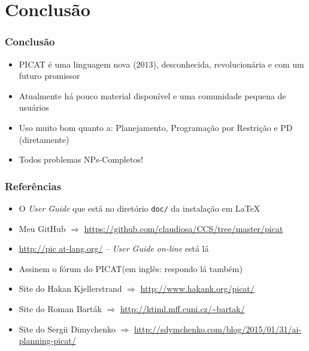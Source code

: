 \documentclass[10pt]{beamer}
\begin{document}


\section{Conclusão}
\begin{frame}
    \frametitle{Conclusão}
    \begin{itemize}
    \item PICAT é uma linguagem nova (2013), 
    desconhecida, revolucionária e com um futuro promissor
    
    \item Atualmente há pouco material disponível e uma comunidade pequena de usuários

    \item Uso muito bom quanto a: Planejamento, Programação por Restrição e PD (diretamente)
    
    \item Todos problemas NPs-Completos!
    \end{itemize}
\end{frame}


\begin{frame}
    \frametitle{Referências}
    \begin{itemize}
    \item O \textit{User Guide} que está no diretório  \texttt{doc/} da instalação em \LaTeX
    
     \item Meu GitHub $\Rightarrow $  \url{https://github.com/claudiosa/CCS/tree/master/picat}

     \item \url{http://pic at-lang.org/} -- \textit{User Guide on-line} está lá
    
    \item Assinem o fórum do PICAT(em inglês: respondo lá também)

    \item Site do Hakan  Kjellerstrand  $\Rightarrow $ \url{http://www.hakank.org/picat/}
    \item Site do Roman Barták  $\Rightarrow $ 	\url{http://ktiml.mff.cuni.cz/~bartak/}
    \item Site do Sergii Dimychenko  $\Rightarrow $ \url{http://sdymchenko.com/blog/2015/01/31/ai-planning-picat/}
    
    \end{itemize}
\end{frame}
\end{document}
